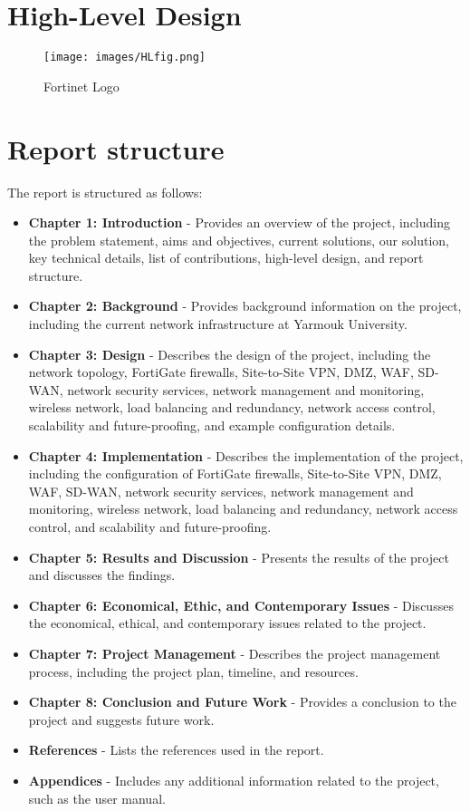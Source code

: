\documentclass[12pt]{report}
\begin{document}
\newpage
\section{High-Level Design}
\begin{figure}[h]
    \centering
    \texttt{[image: images/HLfig.png]}
    \caption{Fortinet Logo}
    \label{fig:High Level Design}
\end{figure}


\section{Report structure}
The report is structured as follows:
\begin{itemize}
    \item \textbf{Chapter 1: Introduction} - Provides an overview of the project, including the problem statement, aims and objectives, current solutions, our solution, key technical details, list of contributions, high-level design, and report structure.
    \item \textbf{Chapter 2: Background} - Provides background information on the project, including the current network infrastructure at Yarmouk University.
    \item \textbf{Chapter 3: Design} - Describes the design of the project, including the network topology, FortiGate firewalls, Site-to-Site VPN, DMZ, WAF, SD-WAN, network security services, network management and monitoring, wireless network, load balancing and redundancy, network access control, scalability and future-proofing, and example configuration details.
    \item \textbf{Chapter 4: Implementation} - Describes the implementation of the project, including the configuration of FortiGate firewalls, Site-to-Site VPN, DMZ, WAF, SD-WAN, network security services, network management and monitoring, wireless network, load balancing and redundancy, network access control, and scalability and future-proofing.
    \item \textbf{Chapter 5: Results and Discussion} - Presents the results of the project and discusses the findings.
    \item \textbf{Chapter 6: Economical, Ethic, and Contemporary Issues} - Discusses the economical, ethical, and contemporary issues related to the project. %

    \item \textbf{Chapter 7: Project Management} - Describes the project management process, including the project plan, timeline, and resources.
    \item \textbf{Chapter 8: Conclusion and Future Work} - Provides a conclusion to the project and suggests future work.
    \item \textbf{References} - Lists the references used in the report.
    \item \textbf{Appendices} - Includes any additional information related to the project, such as the user manual.
\end{itemize}
\end{document}
